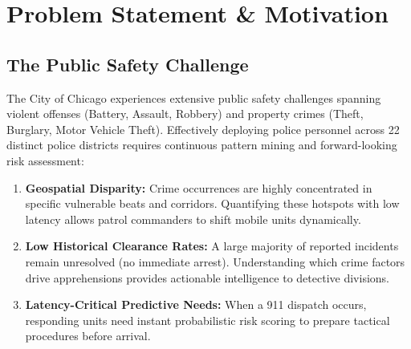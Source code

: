 \documentclass[11pt,a4paper]{article}
\begin{document}
\section{Problem Statement \& Motivation}
\subsection{The Public Safety Challenge}
The City of Chicago experiences extensive public safety challenges spanning violent offenses (Battery, Assault, Robbery) and property crimes (Theft, Burglary, Motor Vehicle Theft). Effectively deploying police personnel across 22 distinct police districts requires continuous pattern mining and forward-looking risk assessment:
\begin{enumerate}
    \item \textbf{Geospatial Disparity:} Crime occurrences are highly concentrated in specific vulnerable beats and corridors. Quantifying these hotspots with low latency allows patrol commanders to shift mobile units dynamically.
    \item \textbf{Low Historical Clearance Rates:} A large majority of reported incidents remain unresolved (no immediate arrest). Understanding which crime factors drive apprehensions provides actionable intelligence to detective divisions.
    \item \textbf{Latency-Critical Predictive Needs:} When a 911 dispatch occurs, responding units need instant probabilistic risk scoring to prepare tactical procedures before arrival.
\end{enumerate}

\end{document}
